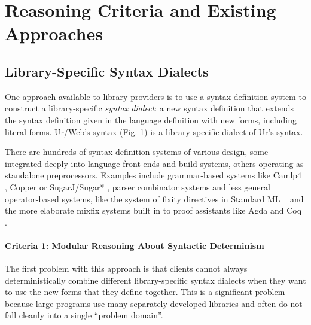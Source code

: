\documentclass[acmsmall,10pt,review,anonymous]{acmart}\settopmatter{printfolios=true}
\begin{document}
\section{Reasoning Criteria and Existing Approaches}\label{sec:existing-approaches}
\subsection{Library-Specific Syntax Dialects}\label{sec:syntax-dialects-intro}
One approach available to library providers is to use a syntax definition system to construct a library-specific \emph{syntax dialect}: a new syntax definition that extends the syntax definition given in the language definition with new forms, including literal forms. Ur/Web's syntax (Fig. 1) is a library-specific dialect of Ur's syntax.


There are hundreds of syntax definition systems of various design, some integrated deeply into language front-ends and build systems, others operating as standalone preprocessors. Examples include grammar-based systems like Camlp4 \cite{ocaml-manual}, Copper \cite{conf/gpce/WykS07} or SugarJ/Sugar* \cite{erdweg2011sugarj,erdweg2013framework}, parser combinator systems \cite{Hutton1992d} and less general operator-based systems, like the system of fixity directives in Standard ML \cite{mthm97-for-dart}~ and the more elaborate mixfix systems \cite{5134,DBLP:conf/gpce/TahaJ03} built in to proof assistants like Agda \cite{DBLP:conf/ifl/DanielssonN08} and Coq \cite{Coq:manual}. 

\paragraph{Criteria 1: Modular Reasoning About Syntactic Determinism}
The first problem with this approach is that clients cannot always deterministically combine different library-specific syntax dialects when they want to use the new forms that they define together. This is a significant problem because large programs use many separately developed libraries \cite{DBLP:conf/sac/LammelPS11} and often do not fall cleanly into a single  ``problem domain''. 
\end{document}
